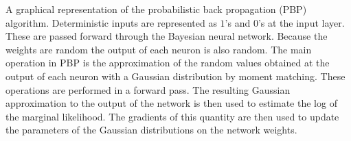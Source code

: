 A graphical representation of the probabilistic back propagation (PBP) algorithm. Deterministic inputs are represented as $1$'s and $0$'s at the input layer. These are passed forward through the Bayesian neural network. Because the weights are random the output of each neuron is also random. The main operation in PBP is the approximation of the random values obtained at the output of each neuron with a Gaussian distribution by moment matching. These operations are performed in a forward pass. The resulting Gaussian approximation to the output of the network is then used to estimate the log of the marginal likelihood. The gradients of this quantity are then used to update the parameters of the Gaussian distributions on the network weights.